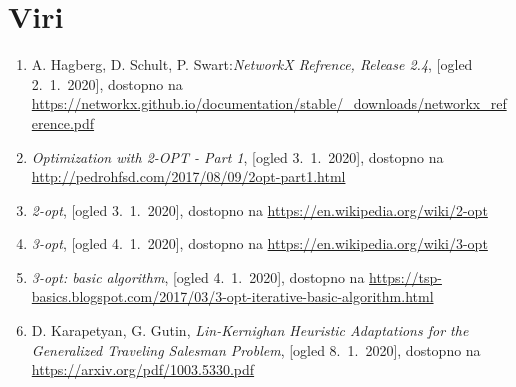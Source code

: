 \documentclass[12pt, a4paper]{article}
\begin{document}
\newpage
\section[Viri]{Viri}

\begin{enumerate}

\item A. Hagberg, D. Schult, P. Swart:\emph{NetworkX Refrence, Release 2.4}, [ogled 2.~1.~2020], dostopno na \url{https://networkx.github.io/documentation/stable/_downloads/networkx_reference.pdf}

\item \emph{Optimization with 2-OPT - Part 1}, [ogled 3.~1.~2020], dostopno na \url{http://pedrohfsd.com/2017/08/09/2opt-part1.html}

\item \emph{2-opt}, [ogled 3.~1.~2020], dostopno na \url{https://en.wikipedia.org/wiki/2-opt}

\item \emph{3-opt}, [ogled 4.~1.~2020], dostopno na \url{https://en.wikipedia.org/wiki/3-opt}

\item \emph{3-opt: basic algorithm}, [ogled 4.~1.~2020], dostopno na \url{https://tsp-basics.blogspot.com/2017/03/3-opt-iterative-basic-algorithm.html}

\item D. Karapetyan, G. Gutin, \emph{Lin-Kernighan Heuristic Adaptations for the Generalized Traveling Salesman Problem}, [ogled  8.~1.~2020], dostopno na \url{https://arxiv.org/pdf/1003.5330.pdf}
\end{enumerate}
\end{document}
